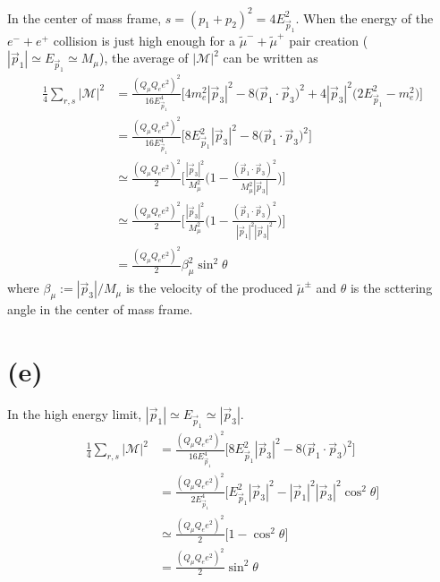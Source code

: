 \documentclass[12pt]{article}
\begin{document}
In the center of mass frame, $s=(p_1+p_2)^2=4E_{\vec{p}_1}^2$. When the energy of the 
$e^-+e^+$ collision is just high enough for a $\tilde{\mu}^-+\tilde{\mu}^+$ pair 
creation ($|\vec{p}_1|\simeq E_{\vec{p}_1}\simeq M_\mu$), the average of 
$|\mathcal{M}|^2$ can be written as
\begin{equation}
    \begin{split}
        \frac{1}{4}\sum_{r,s}|\mathcal{M}|^2&=\frac{(Q_\mu Q_e e^2)^2}
        {16E_{\vec{p}_1}^4}\Big[4m_e^2|\vec{p}_3|^2-8\big(\vec{p}_1\cdot
        \vec{p}_3\big)^2+4|\vec{p}_3|^2\big(2E_{\vec{p}_1}^2-m_e^2\big)\Big]\\
        &=\frac{(Q_\mu Q_e e^2)^2}{16E_{\vec{p}_1}^4}\Big[8E_{\vec{p}_1}^2
        |\vec{p}_3|^2-8\big(\vec{p}_1\cdot\vec{p}_3\big)^2\Big]\\
        &\simeq\frac{(Q_\mu Q_e e^2)^2}{2}\Bigg[\frac{|\vec{p}_3|^2}{M_\mu^2}
        \Bigg(1-\frac{(\vec{p}_1\cdot\vec{p}_3)^2}{M_\mu^2|\vec{p}_3|}\Bigg)\Bigg]\\
        &\simeq\frac{(Q_\mu Q_e e^2)^2}{2}\Bigg[\frac{|\vec{p}_3|^2}{M_\mu^2}
        \Bigg(1-\frac{(\vec{p}_1\cdot\vec{p}_3)^2}{|\vec{p}_1|^2|\vec{p}_3|^2}\Bigg)\Bigg]\\
        &=\frac{(Q_\mu Q_e e^2)^2}{2}\beta_\mu^2\sin^2\theta
    \end{split}
\end{equation}
where $\beta_\mu:=|\vec{p}_3|/M_\mu$ is the velocity of the produced 
$\tilde{\mu}^\pm$ and $\theta$ is the scttering angle in the center of mass frame.

\section*{(e)}

In the high energy limit, $|\vec{p}_1|\simeq E_{\vec{p}_1}\simeq|\vec{p}_3|$.
\begin{equation}
    \begin{split}
        \frac{1}{4}\sum_{r,s}|\mathcal{M}|^2&=\frac{(Q_\mu Q_e e^2)^2}{16E_{\vec{p}_1}^4}
        \Big[8E_{\vec{p}_1}^2|\vec{p}_3|^2-8\big(\vec{p}_1\cdot\vec{p}_3\big)^2\Big]\\
        &=\frac{(Q_\mu Q_e e^2)^2}{2E_{\vec{p}_1}^4}\Big[E_{\vec{p}_1}^2|\vec{p}_3|^2
        -|\vec{p}_1|^2|\vec{p}_3|^2\cos^2\theta\Big]\\
        &\simeq\frac{(Q_\mu Q_e e^2)^2}{2}\big[1-\cos^2\theta\big]\\
        &=\frac{(Q_\mu Q_e e^2)^2}{2}\sin^2\theta
    \end{split}
\end{equation}
\end{document}
